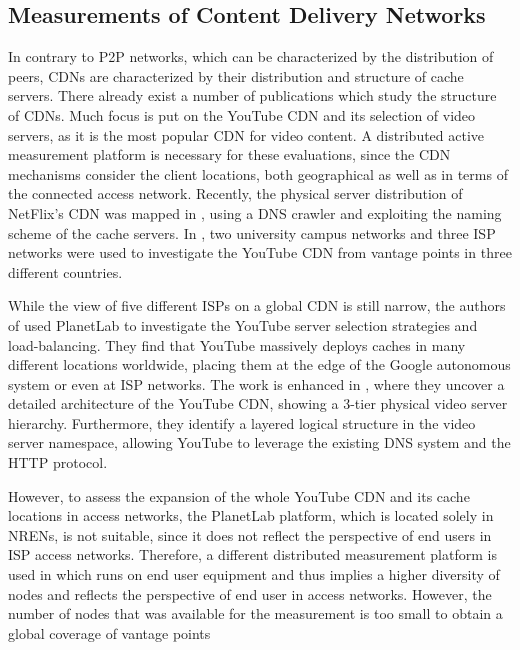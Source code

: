 \subsection{Measurements of Content Delivery Networks}\label{aslevel:measurements:cdn}

In contrary to P2P networks, which can be characterized by the distribution of peers, CDNs are characterized by their distribution and structure of cache servers.
There already exist a number of publications which study the structure of CDNs.
Much focus is put on the YouTube CDN and its selection of video servers, as it is the most popular CDN for video content.
A distributed active measurement platform is necessary for these evaluations, since the CDN mechanisms consider the client locations, both geographical as well as in terms of the connected access network.
Recently, the physical server distribution of NetFlix's CDN was mapped in \cite{bottger2016open}, using a DNS crawler and exploiting the naming scheme of the cache servers.
In \cite{torres2011dissecting}, two university campus networks and three ISP networks were used to investigate the YouTube CDN from vantage points in three different countries.

While the view of five different ISPs on a global CDN is still narrow, the authors of \cite{adhikari2011you} used PlanetLab to investigate the YouTube server selection strategies and load-balancing.
They find that YouTube massively deploys caches in many different locations worldwide, placing them at the edge of the Google autonomous system or even at ISP networks.
The work is enhanced in \cite{adhikari2012vivisecting}, where they uncover a detailed architecture of the YouTube CDN, showing a 3-tier physical video server hierarchy.
Furthermore, they identify a layered logical structure in the video server namespace, allowing YouTube to leverage the existing DNS system and the HTTP protocol.

However, to assess the expansion of the whole YouTube CDN and its cache locations in access networks, the PlanetLab platform, which is located solely in NRENs, is not suitable, since it does not reflect the perspective of end users in ISP access networks.
Therefore, a different distributed measurement platform is used in \cite{rafetseder2011exploring} which runs on end user equipment and thus implies a higher diversity of nodes and reflects the perspective of end user in access networks.
However, the number of nodes that was available for the measurement is too small to obtain a global coverage of vantage points


